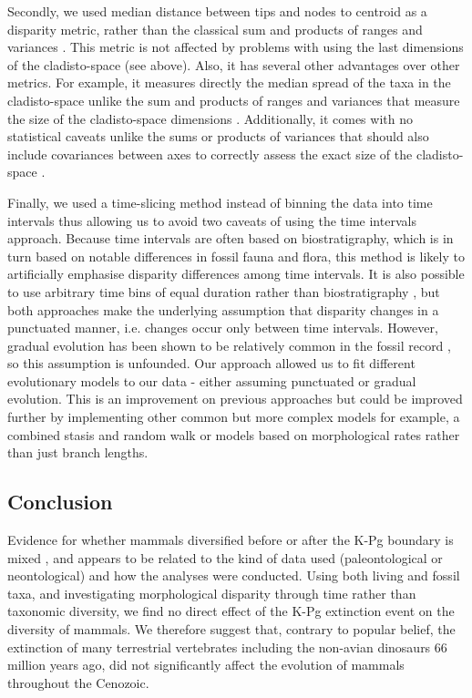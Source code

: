 \documentclass[10pt,letterpaper]{article}
\begin{document}
Secondly, we used median distance between tips and nodes to centroid as a disparity metric, rather than the classical sum and products of ranges and variances \citep{Wills1994}.
This metric is not affected by problems with using the last dimensions of the cladisto-space (see above).
Also, it has several other advantages over other metrics.
For example, it measures directly the median spread of the taxa in the cladisto-space unlike the sum and products of ranges and variances that measure the size of the cladisto-space dimensions \citep{Wills1994}.
Additionally, it comes with no statistical caveats unlike the sums or products of variances that should also include covariances between axes to correctly assess the exact size of the cladisto-space \citep[even though the covariance term is usually close to 0 because of the eigen decomposition;][]{GOWER01121966}.

Finally, we used a time-slicing method instead of binning the data into time intervals \citep[e.g in:][]{cisneros2010,prentice2011,Hughes20082013,hopkinsdecoupling2013,bentonmodels2014,bensonfaunal2014} thus allowing us to avoid two caveats of using the time intervals approach.
Because time intervals are often based on biostratigraphy, which is in turn based on notable differences in fossil fauna and flora, this method is likely to artificially emphasise disparity differences among time intervals.
It is also possible to use arbitrary time bins of equal duration rather than biostratigraphy \citep{Butler2012,hopkinsdecoupling2013,bensonfaunal2014}, but both approaches make the underlying assumption that disparity changes in a punctuated  manner, i.e. changes occur only between time intervals.
However, gradual evolution has been shown to be relatively common in the fossil record \citep{Hunt20112007,Hunt21042015}, so this assumption is unfounded.
Our approach allowed us to fit different evolutionary models to our data - either assuming punctuated or gradual evolution.
This is an improvement on previous approaches but could be improved further by implementing other common but more complex models for example, a combined stasis and random walk \citep{Hunt21042015} or models based on morphological rates rather than just branch lengths.

\subsection{Conclusion}
Evidence for whether mammals diversified before or after the K-Pg boundary is mixed \citep{meredithimpacts2011,O'Leary08022013,dosReis2014,beckancient2014}, and appears to be related to the kind of data used (paleontological or neontological) and how the analyses were conducted.
Using both living and fossil taxa, and investigating morphological disparity through time rather than taxonomic diversity, we find no direct effect of the K-Pg extinction event on the diversity of mammals. 
We therefore suggest that, contrary to popular belief, the extinction of many terrestrial vertebrates including the non-avian dinosaurs 66 million years ago, did not significantly affect the evolution of mammals throughout the Cenozoic.
\end{document}

